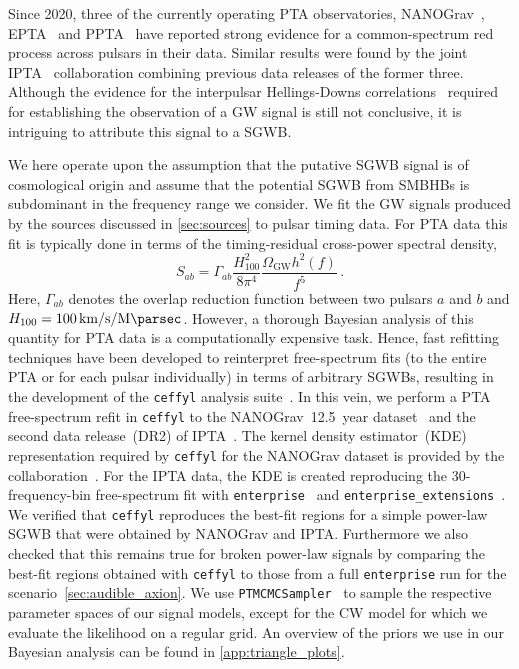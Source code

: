 \documentclass{article}
\newcommand*{\GW}{\ensuremath{\mathrm{GW}}\xspace}
\begin{document}
Since 2020, three of the currently operating PTA observatories, NANOGrav~\cite{NANOGrav:2020bcs}, EPTA~\cite{Chen:2021rqp} and PPTA~\cite{Goncharov:2021oub} have reported strong evidence for a common-spectrum red process across pulsars in their data.
Similar results were found by the joint IPTA~\cite{Antoniadis:2022pcn} collaboration combining previous data releases of the former three.
Although the evidence for the interpulsar Hellings-Downs correlations~\cite{Hellings:1983fr} required for establishing the observation of a GW signal is still not conclusive, it is intriguing to attribute this signal to a SGWB.

We here operate upon the assumption that the putative SGWB signal is of cosmological origin and assume that the potential SGWB from SMBHBs is subdominant in the frequency range we consider.
We fit the GW signals produced by the sources discussed in \cref{sec:sources} to pulsar timing data.
For PTA data this fit is typically done in terms of the timing-residual cross-power spectral density,
\begin{equation}
    S_{ab} = \Gamma_{ab} \frac{H_{100}^2}{8 \pi^4} \frac{\Omega_{\GW}h^2 (f)}{f^5} \, .
\end{equation}
Here, $\Gamma_{ab}$ denotes the overlap reduction function between two pulsars $a$ and $b$ and $H_{100} = \SI{100}{\kilo\meter\per\second\per\mega\parsec}$.
However, a thorough Bayesian analysis of this quantity for PTA data is a computationally expensive task.
Hence, fast refitting techniques have been developed to reinterpret free-spectrum fits (to the entire PTA or for each pulsar individually) in terms of arbitrary SGWBs, resulting in the development of the \texttt{ceffyl} analysis suite~\cite{Lamb:2023jls}.
In this vein, we perform a PTA free-spectrum refit in \texttt{ceffyl} to the NANOGrav~12.5~year dataset~\cite{NANOGrav:2020gpb} and the second data release~(DR2) of IPTA~\cite{Perera:2019sca,Antoniadis:2022pcn}. 
The kernel density estimator~(KDE) representation required by \texttt{ceffyl} for the NANOGrav dataset is provided by the collaboration~\cite{NANOGrav:KDErepresentation}.
For the IPTA data, the KDE is created reproducing the 30-frequency-bin free-spectrum fit with \texttt{enterprise}~\cite{enterprise} and \texttt{enterprise\_extensions}~\cite{enterprise_extensions}. We verified that \texttt{ceffyl} reproduces the best-fit regions for a simple power-law SGWB that were obtained by NANOGrav and IPTA. Furthermore we also checked that this remains true for broken power-law signals by comparing the best-fit regions obtained with \texttt{ceffyl} to those from a full \texttt{enterprise} run for the scenario~\cref{sec:audible_axion}.
We use \texttt{PTMCMCSampler}~\cite{ptmcmc} to sample the respective parameter spaces of our signal models, except for the CW model for which we evaluate the likelihood on a regular grid.
An overview of the priors we use in our Bayesian analysis can be found in \cref{app:triangle_plots}.
\end{document}
